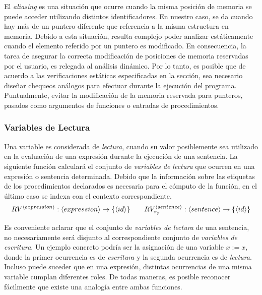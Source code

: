 El \textit{aliasing} es una situación que ocurre cuando la misma posición de memoria se puede acceder utilizando distintos identificadores.
En nuestro caso, se da cuando hay más de un puntero diferente que referencia a la misma estructura en memoria.
Debido a esta situación, resulta complejo poder analizar estáticamente cuando el elemento referido por un puntero es modificado.
En consecuencia, la tarea de asegurar la correcta modificación de posiciones de memoria reservadas por el usuario, es relegada al análisis dinámico.
Por lo tanto, es posible que de acuerdo a las verificaciones estáticas especificadas en la sección, sea necesario diseñar chequeos análogos para efectuar durante la ejecución del programa.
Puntualmente, evitar la modificación de la memoria reservada para punteros, pasados como argumentos de funciones o entradas de procedimientos.

\subsubsection{Variables de Lectura}

Una variable es considerada de \textit{lectura}, cuando su valor posiblemente sea utilizado en la evaluación de una expresión durante la ejecución de una sentencia.
La siguiente función calculará el conjunto de \textit{variables de lectura} que ocurren en una expresión o sentencia determinada.
Debido que la información sobre las etiquetas de los procedimientos declarados es necesaria para el cómputo de la función, en el último caso se indexa con el contexto correspondiente.
\begin{gather*}
RV^{\langle expression \rangle}: \langle expression \rangle \rightarrow \{ \langle id \rangle \}
\qquad
RV^{\langle sentence \rangle}_{\pi_{p}}: \langle sentence \rangle \rightarrow \{ \langle id \rangle \}
\end{gather*}

Es conveniente aclarar que el conjunto de \textit{variables de lectura} de una sentencia, no necesariamente será disjunto al correspondiente conjunto de \textit{variables de escritura}.
Un ejemplo concreto podría ser la asignación de una variable $x := x$, donde la primer ocurrencia es de \textit{escritura} y la segunda ocurrencia es de \textit{lectura}.
Incluso puede suceder que en una expresión, distintas ocurrencias de una misma variable cumplan diferentes roles.
De todas maneras, es posible reconocer fácilmente que existe una analogía entre ambas funciones.

